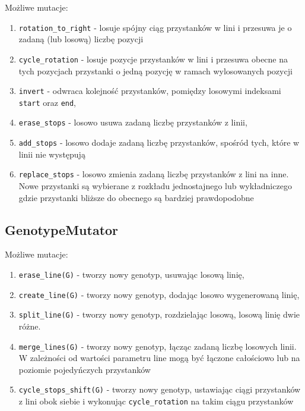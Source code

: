 \documentclass[12pt,a4paper,openright]{mwrep}
\begin{document}
Możliwe mutacje:

\begin{enumerate}
  \item \lstinline{rotation_to_right} - losuje spójny ciąg przystanków w lini i przesuwa je o zadaną (lub losową) liczbę pozycji
    \item \lstinline{cycle_rotation} - losuje pozycje przystanków w lini i przesuwa obecne na tych pozycjach przystanki o jedną pozycję w ramach wylosowanych pozycji
    \item \lstinline{invert} - odwraca kolejność przystanków, pomiędzy losowymi indeksami \lstinline{start} oraz \lstinline{end},
    \item \lstinline{erase_stops} - losowo usuwa zadaną liczbę przystanków z linii,
    \item \lstinline{add_stops} - losowo dodaje zadaną liczbę przystanków, spośród tych, które w linii nie występują
    \item \lstinline{replace_stops} - losowo zmienia zadaną liczbę przystanków z lini na inne. Nowe przystanki są wybierane z rozkładu jednostajnego lub wykładniczego gdzie przystanki bliższe do obecnego są bardziej prawdopodobne
\end{enumerate}

\subsection{GenotypeMutator}

Możliwe mutacje:

\begin{enumerate}
  	\item \lstinline{erase_line(G)} - tworzy nowy genotyp, usuwając losową linię,
    \item \lstinline{create_line(G)} - tworzy nowy genotyp, dodając losowo wygenerowaną linię,
    \item \lstinline{split_line(G)} - tworzy nowy genotyp, rozdzielając losową, losową linię dwie różne.
    \item \lstinline{merge_lines(G)} - tworzy nowy genotyp, łącząc zadaną liczbę losowych linii. W zależności od wartości parametru line mogą być łączone całościowo lub na poziomie pojedyńczych przystanków
    \item \lstinline{cycle_stops_shift(G)} - tworzy nowy genotyp, ustawiając ciągi przystanków z lini obok siebie i wykonując \lstinline{cycle_rotation} na takim ciągu przystanków
\end{enumerate}
\end{document}
